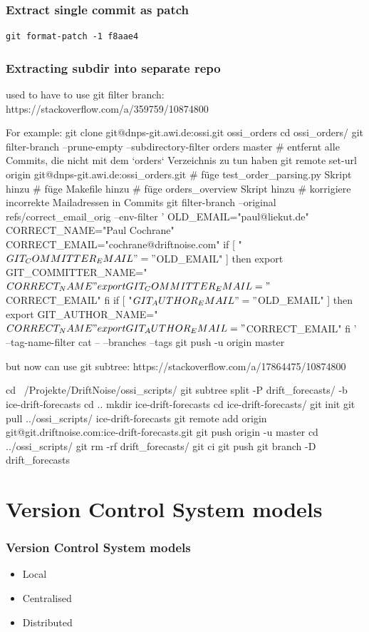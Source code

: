 \documentclass{git_course}
\begin{document}
\begin{frame}[fragile]
\frametitle{Extract single commit as patch}
\begin{lstlisting}
git format-patch -1 f8aae4
\end{lstlisting}
\end{frame}

\begin{frame}
\frametitle{Extracting subdir into separate repo}
used to have to use git filter branch:
    https://stackoverflow.com/a/359759/10874800

For example:
git clone git@dnps-git.awi.de:ossi.git ossi_orders
cd ossi_orders/
git filter-branch --prune-empty --subdirectory-filter orders master   # entfernt alle Commits, die nicht mit dem `orders` Verzeichnis zu tun haben
git remote set-url origin git@dnps-git.awi.de:ossi_orders.git
# füge test_order_parsing.py Skript hinzu
# füge Makefile hinzu
# füge orders_overview Skript hinzu
# korrigiere incorrekte Mailadressen in Commits
git filter-branch --original refs/correct_email_orig --env-filter '
OLD_EMAIL="paul@liekut.de"
CORRECT_NAME="Paul Cochrane"
CORRECT_EMAIL="cochrane@driftnoise.com"
if [ "$GIT_COMMITTER_EMAIL" = "$OLD_EMAIL" ]
then
export GIT_COMMITTER_NAME="$CORRECT_NAME"
export GIT_COMMITTER_EMAIL="$CORRECT_EMAIL"
fi
if [ "$GIT_AUTHOR_EMAIL" = "$OLD_EMAIL" ]
then
export GIT_AUTHOR_NAME="$CORRECT_NAME"
export GIT_AUTHOR_EMAIL="$CORRECT_EMAIL"
fi
' --tag-name-filter cat -- --branches --tags
git push -u origin master

but now can use git subtree:
    https://stackoverflow.com/a/17864475/10874800

cd ~/Projekte/DriftNoise/ossi_scripts/
git subtree split -P drift_forecasts/ -b ice-drift-forecasts
cd ..
mkdir ice-drift-forecasts
cd ice-drift-forecasts/
git init
git pull ../ossi_scripts/ ice-drift-forecasts
git remote add origin git@git.driftnoise.com:ice-drift-forecasts.git
git push origin -u master
cd ../ossi_scripts/
git rm -rf drift_forecasts/
git ci
git push
git branch -D drift_forecasts
\end{frame}

\appendix

\section{Version Control System models}

\begin{frame}
    \frametitle{Version Control System models}
    \begin{itemize}
        \item Local
        \item Centralised
        \item Distributed
    \end{itemize}
\end{frame}
\end{document}
